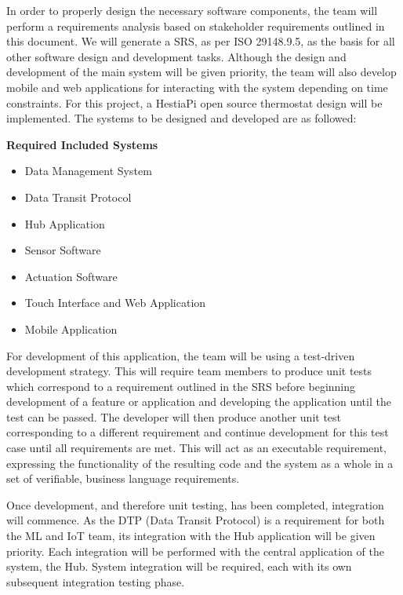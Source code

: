\documentclass{article}
\begin{document}
In order to properly design the necessary software components, the team will perform a requirements analysis based on stakeholder requirements outlined in this document. We will generate a \gls{SRS}, as per \gls{ISO} 29148.9.5, as the basis for all other software design and development tasks. Although the design and development of the main system will be given priority, the team will also develop mobile and web applications for interacting with the system depending on time constraints. For this project, a HestiaPi open source thermostat design will be implemented. The systems to be designed and developed are as followed:

\begin{flushleft}
\large
{}
\textbf{Required Included Systems}
\end{flushleft}
\begin{itemize}
    \item{Data Management System}
	\item{Data Transit Protocol}
	\item{Hub Application}
	\item{Sensor Software}
	\item{Actuation Software}
	\item{Touch Interface and Web Application}
	\item{Mobile Application}
\end{itemize}

For development of this application, the team will be using a test-driven development strategy. This will require team members to produce unit tests which correspond to a requirement outlined in the \gls{SRS} before beginning development of a feature or application and developing the application until the test can be passed. The developer will then produce another unit test corresponding to a different requirement and continue development for this test case until all requirements are met. This will act as an executable requirement, expressing the functionality of the resulting code and the system as a whole in a set of verifiable, business language requirements.

Once development, and therefore unit testing, has been completed, integration will commence. As the \gls{DTP} (Data Transit Protocol) is a requirement for both the \gls{ML} and \gls{IoT} team, its integration with the Hub application will be given priority. Each integration will be performed with the central application of the system, the Hub. System integration will be required, each with its own subsequent integration testing phase.
\end{document}
